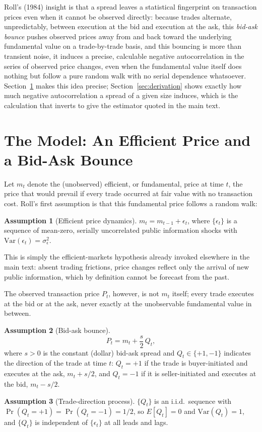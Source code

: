 \documentclass[11pt]{article}
\theoremstyle{remark}
\theoremstyle{definition}
\newtheorem{assumption}{Assumption}
\begin{document}
Roll's (1984) insight is that a spread leaves a statistical fingerprint on transaction prices even when it cannot be observed directly: because trades alternate, unpredictably, between execution at the bid and execution at the ask, this \emph{bid-ask bounce} pushes observed prices away from and back toward the underlying fundamental value on a trade-by-trade basis, and this bouncing is more than transient noise, it induces a precise, calculable negative autocorrelation in the series of observed price changes, even when the fundamental value itself does nothing but follow a pure random walk with no serial dependence whatsoever. Section~\ref{sec:model} makes this idea precise; Section~\ref{sec:derivation} shows exactly how much negative autocorrelation a spread of a given size induces, which is the calculation that inverts to give the estimator quoted in the main text.

\section{The Model: An Efficient Price and a Bid-Ask Bounce}
\label{sec:model}

Let $m_t$ denote the (unobserved) efficient, or fundamental, price at time $t$, the price that would prevail if every trade occurred at fair value with no transaction cost. Roll's first assumption is that this fundamental price follows a random walk:
\begin{assumption}[Efficient price dynamics]
\label{ass:rw}
$m_t = m_{t-1} + \epsilon_t$, where $\{\epsilon_t\}$ is a sequence of mean-zero, serially uncorrelated public information shocks with $\mathrm{Var}(\epsilon_t) = \sigma_\epsilon^2$.
\end{assumption}
This is simply the efficient-markets hypothesis already invoked elsewhere in the main text: absent trading frictions, price changes reflect only the arrival of new public information, which by definition cannot be forecast from the past.

The observed transaction price $P_t$, however, is not $m_t$ itself; every trade executes at the bid or at the ask, never exactly at the unobservable fundamental value in between.
\begin{assumption}[Bid-ask bounce]
\label{ass:bounce}
\begin{equation*}
P_t = m_t + \frac{s}{2}\,Q_t,
\end{equation*}
where $s>0$ is the constant (dollar) bid-ask spread and $Q_t \in \{+1,-1\}$ indicates the direction of the trade at time $t$: $Q_t=+1$ if the trade is buyer-initiated and executes at the ask, $m_t + s/2$, and $Q_t=-1$ if it is seller-initiated and executes at the bid, $m_t - s/2$.
\end{assumption}
\begin{assumption}[Trade-direction process]
\label{ass:direction}
$\{Q_t\}$ is an i.i.d.\ sequence with $\Pr(Q_t=+1)=\Pr(Q_t=-1)=1/2$, so $E[Q_t]=0$ and $\mathrm{Var}(Q_t)=1$, and $\{Q_t\}$ is independent of $\{\epsilon_t\}$ at all leads and lags.
\end{assumption}
\end{document}
